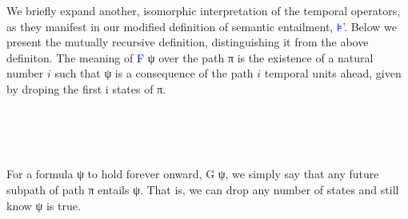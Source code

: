 \documentclass{article}
\newcommand{\blue}[1]{\textcolor{blue}{#1}}
\begin{document}
We briefly expand another, isomorphic interpretation of the temporal operators,
as they manifest in our modified definition of semantic entailment, \blue{⊧'}.
Below we present the mutually recursive definition, distinguishing it from the
above definiton. The meaning of \blue{F} ψ over the path π is the existence of a
natural number $i$ such that ψ is a consequence of the path $i$ temporal units
ahead, given by droping the first i states of π.

\begin{code}[hide]%
\>[0]\<%
\end{code}
\begin{code}%
\>[0][@{}l@{\AgdaIndent{1}}]%
\>[2]\<%
\\
%
\\[\AgdaEmptyExtraSkip]%
\>[2][@{}l@{\AgdaIndent{0}}]%
\>[4]\AgdaSpace{}%
\AgdaSymbol{:}\AgdaSpace{}%
\AgdaSpace{}%
\AgdaSpace{}%
\AgdaSpace{}%
\AgdaSpace{}%
\<%
\\
%
\>[4]\AgdaSpace{}%
\AgdaSpace{}%
\AgdaSpace{}%
\AgdaSymbol{=}\AgdaSpace{}%
\AgdaFunction{Σ[}\AgdaSpace{}%
\AgdaSpace{}%
\AgdaSpace{}%
\AgdaSpace{}%
\AgdaFunction{]}\AgdaSpace{}%
\AgdaSymbol{(}\AgdaSpace{}%
\AgdaSpace{}%
\AgdaSymbol{)}\AgdaSpace{}%
\AgdaSpace{}%
\<%
\end{code}

For a formula ψ to hold forever onward, \blue{G} ψ, we simply say that any future
subpath of path π entails ψ. That is, we can drop any number of states and still
know ψ is true.

\begin{code}%
%
\>[4]\AgdaSpace{}%
\AgdaSymbol{:}\AgdaSpace{}%
\AgdaSpace{}%
\AgdaSpace{}%
\AgdaSpace{}%
\AgdaSpace{}%
\<%
\\
%
\>[4]\AgdaSpace{}%
\AgdaSpace{}%
\AgdaSpace{}%
\AgdaSymbol{=}\AgdaSpace{}%
\AgdaSpace{}%
\AgdaSpace{}%
\AgdaSpace{}%
\AgdaSymbol{(}\AgdaSpace{}%
\AgdaSpace{}%
\AgdaSymbol{)}\AgdaSpace{}%
\AgdaSpace{}%
\<%
\end{code}
\end{document}
